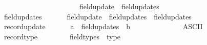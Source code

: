 \begin{isabellebody}
\ \ {\isachardoublequoteopen}{\isachardoublequoteclose}\ \ \ \ \ \ \ \ \ \ \ \ \ \ \ \ \ \ \ \ {\isacharcolon}{\kern0pt}{\isacharcolon}{\kern0pt}\ {\isachardoublequoteopen}field{\isacharunderscore}{\kern0pt}update\ {\isacharequal}{\kern0pt}{\isachargreater}{\kern0pt}\ field{\isacharunderscore}{\kern0pt}updates{\isachardoublequoteclose}\ \ \ \ \ \ {\isacharparenleft}{\kern0pt}{\isachardoublequoteopen}{\isacharunderscore}{\kern0pt}{\isachardoublequoteclose}{\isacharparenright}{\kern0pt}\isanewline
\ \ {\isachardoublequoteopen}{\isacharunderscore}{\kern0pt}field{\isacharunderscore}{\kern0pt}updates{\isachardoublequoteclose}\ \ \ \ \ \ {\isacharcolon}{\kern0pt}{\isacharcolon}{\kern0pt}\ {\isachardoublequoteopen}field{\isacharunderscore}{\kern0pt}update\ {\isacharequal}{\kern0pt}{\isachargreater}{\kern0pt}\ field{\isacharunderscore}{\kern0pt}updates\ {\isacharequal}{\kern0pt}{\isachargreater}{\kern0pt}\ field{\isacharunderscore}{\kern0pt}updates{\isachardoublequoteclose}\ \ {\isacharparenleft}{\kern0pt}{\isachardoublequoteopen}{\isacharunderscore}{\kern0pt}{\isacharcomma}{\kern0pt}{\isacharslash}{\kern0pt}\ {\isacharunderscore}{\kern0pt}{\isachardoublequoteclose}{\isacharparenright}{\kern0pt}\isanewline
\ \ {\isachardoublequoteopen}{\isacharunderscore}{\kern0pt}record{\isacharunderscore}{\kern0pt}update{\isachardoublequoteclose}\ \ \ \ \ \ {\isacharcolon}{\kern0pt}{\isacharcolon}{\kern0pt}\ {\isachardoublequoteopen}{\isacharprime}{\kern0pt}a\ {\isacharequal}{\kern0pt}{\isachargreater}{\kern0pt}\ field{\isacharunderscore}{\kern0pt}updates\ {\isacharequal}{\kern0pt}{\isachargreater}{\kern0pt}\ {\isacharprime}{\kern0pt}b{\isachardoublequoteclose}\ \ \ \ \ \ \ \ \ \ {\isacharparenleft}{\kern0pt}{\isachardoublequoteopen}{\isacharunderscore}{\kern0pt}{\isacharslash}{\kern0pt}{\isacharparenleft}{\kern0pt}{}{\isasymlparr}{\isacharunderscore}{\kern0pt}{\isasymrparr}{\isacharparenright}{\kern0pt}{\isachardoublequoteclose}\ {\isacharbrackleft}{\kern0pt}{}{}{}{\isacharcomma}{\kern0pt}\ {}{\isacharbrackright}{\kern0pt}\ {}{}{}{\isacharparenright}{\kern0pt}\isanewline
\isanewline
{}\isamarkupfalse%
\ {\isacharparenleft}{\kern0pt}ASCII{\isacharparenright}{\kern0pt}\isanewline
\ \ {\isachardoublequoteopen}{\isacharunderscore}{\kern0pt}record{\isacharunderscore}{\kern0pt}type{\isachardoublequoteclose}\ \ \ \ \ \ \ \ {\isacharcolon}{\kern0pt}{\isacharcolon}{\kern0pt}\ {\isachardoublequoteopen}field{\isacharunderscore}{\kern0pt}types\ {\isacharequal}{\kern0pt}{\isachargreater}{\kern0pt}\ type{\isachardoublequoteclose}\ \ \ \ \ \ \ \ \ \ \ \ \ \ \ \ {\isacharparenleft}{\kern0pt}{\isachardoublequoteopen}{\isacharparenleft}{\kern0pt}{}{\isacharprime}{\kern0pt}{\isacharparenleft}{\kern0pt}{\isacharbar}{\kern0pt}\ {\isacharunderscore}{\kern0pt}\ {\isacharbar}{\kern0pt}{\isacharprime}{\kern0pt}{\isacharparenright}{\kern0pt}{\isacharparenright}{\kern0pt}{\isachardoublequoteclose}{\isacharparenright}{\kern0pt}\isanewline

\end{isabellebody}
